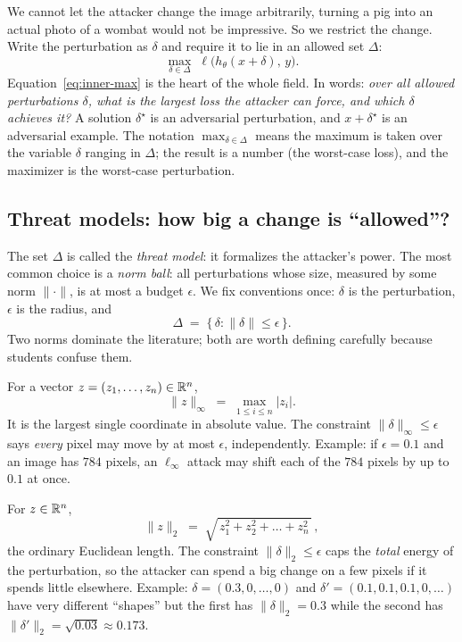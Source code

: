 We cannot let the attacker change the image arbitrarily, turning a pig into an actual photo of a wombat would not be impressive. So we restrict the change. Write the perturbation as $\delta$ and require it to lie in an allowed set $\Delta$:
\begin{equation}
  \label{eq:inner-max}
  \max_{\delta \in \Delta}\; \ell\!\big(h_\theta(x+\delta),\, y\big).
\end{equation}
Equation~\eqref{eq:inner-max} is the heart of the whole field. In words: \emph{over all allowed perturbations $\delta$, what is the largest loss the attacker can force, and which $\delta$ achieves it?} A solution $\delta^\star$ is an adversarial perturbation, and $x+\delta^\star$ is an adversarial example. The notation $\max_{\delta\in\Delta}$ means the maximum is taken over the variable $\delta$ ranging in $\Delta$; the result is a number (the worst-case loss), and the maximizer is the worst-case perturbation.

\subsection{Threat models: how big a change is ``allowed''?}
\label{sub:threat}

The set $\Delta$ is called the \emph{threat model}: it formalizes the attacker's power. The most common choice is a \emph{norm ball}: all perturbations whose size, measured by some norm $\|\cdot\|$, is at most a budget $\epsilon$. We fix conventions once: $\delta$ is the perturbation, $\epsilon$ is the radius, and
\[
  \Delta \;=\; \{\,\delta : \|\delta\| \le \epsilon\,\}.
\]
Two norms dominate the literature; both are worth defining carefully because students confuse them.

\begin{definition}
For a vector $z=(z_1,\dots,z_n)\in\mathbb{R}^n$,
\[
  \|z\|_\infty \;=\; \max_{1\le i\le n} |z_i| .
\]
It is the largest single coordinate in absolute value. The constraint $\|\delta\|_\infty\le\epsilon$ says \emph{every} pixel may move by at most $\epsilon$, independently. Example: if $\epsilon=0.1$ and an image has $784$ pixels, an $\ell_\infty$ attack may shift each of the $784$ pixels by up to $0.1$ at once.
\end{definition}

\begin{definition}
For $z\in\mathbb{R}^n$,
\[
  \|z\|_2 \;=\; \sqrt{\,z_1^2 + z_2^2 + \dots + z_n^2\,}\,,
\]
the ordinary Euclidean length. The constraint $\|\delta\|_2\le\epsilon$ caps the \emph{total} energy of the perturbation, so the attacker can spend a big change on a few pixels if it spends little elsewhere. Example: $\delta=(0.3,0,\dots,0)$ and $\delta'=(0.1,0.1,0.1,0,\dots)$ have very different ``shapes'' but the first has $\|\delta\|_2=0.3$ while the second has $\|\delta'\|_2=\sqrt{0.03}\approx0.173$.
\end{definition}

